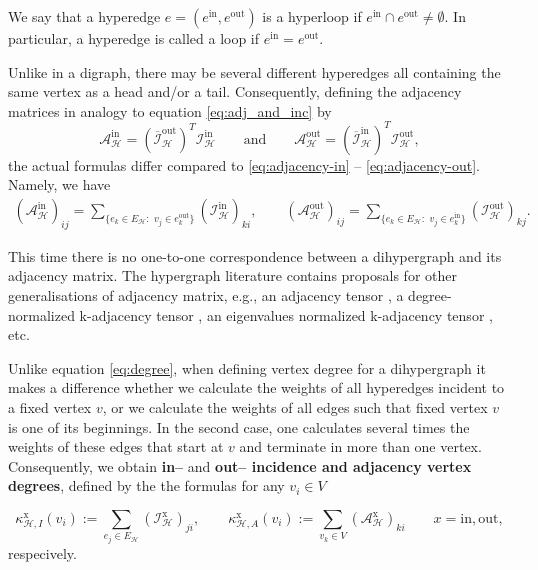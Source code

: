 \documentclass[a4paper,12pt]{article}
\theoremstyle{definition}
\theoremstyle{remark}
\newcommand{\mH}{\mathcal{H}}
\newcommand{\tin}{\mathrm{in}}
\newcommand{\out}{\mathrm{out}}
\newcommand{\inci}{\mathcal{I}^{\tin}}
\newcommand{\inco}{\mathcal{I}^{\out}}
\begin{document}
 We say that a hyperedge $e=(e^{\tin}, e^{\out})$ is a hyperloop if $e^{\tin}\cap e^{\out}\neq \emptyset$. In particular, a hyperedge is called a loop if $e^{\tin}=e^{\out}$. %
 
 Unlike in a digraph, there may be several different hyperedges all containing the same vertex as a head and/or a tail. Consequently, defining the adjacency matrices in analogy to equation \eqref{eq:adj_and_inc} by
 \begin{equation}\label{eq:adj_and_inc2}
\mathcal{A}_{\mH}^{\tin}=(\overline{\mathcal{I}}^{\textrm{out}}_{\mH})^T \inci_{\mH} \qquad \textrm{and}\qquad \mathcal{A}_{\mH}^{\out}=(\overline{\mathcal{I}}^{\textrm{in}}_{\mH})^T \inco_{\mH},
\end{equation}
the actual formulas differ compared to \eqref{eq:adjacency-in} -- \eqref{eq:adjacency-out}. Namely, we have
\begin{eqnarray}\label{eq:adjacency-in-out2}
(\mathcal{A}_{\mH}^{\tin})_{ij}=\sum_{\{e_k \in E_{\mH}:\,\, v_j\in e_k^{\out}\}}
(\inci_{\mH})_{ki},\qquad (\mathcal{A}_{\mH}^{\out})_{ij}=\sum_{\{e_k \in E_{\mH}:\,\, v_j\in e_k^{\tin}\}}(\inco_{\mH})_{kj}. 
\end{eqnarray}

This time there is no one-to-one correspondence between a dihypergraph and its adjacency matrix.
The hypergraph literature contains proposals for other generalisations of adjacency matrix, e.g., an adjacency tensor \protect\cite{Michoel2012}, a degree-normalized k-adjacency tensor \protect\cite{COOPER2012}, an eigenvalues normalized k-adjacency tensor \protect\cite{Hu2013}, etc.

Unlike equation \eqref{eq:degree}, when defining vertex degree for a dihypergraph it makes a difference whether we calculate the weights of all hyperedges incident to a fixed vertex $v$, or we calculate the weights of all edges such that fixed vertex $v$ is one of its beginnings. In the second case, one calculates several times the weights of these edges that start at $v$ and terminate in more than one vertex. Consequently, we obtain \textbf{in--} and \textbf{out-- incidence and adjacency vertex degrees}, defined by the the formulas for any $v_i\in V$

\begin{equation} 
    \kappa_{\mH, I}^{\mathrm{x}}(v_i):=\sum_{e_j\in E_{\mH}}(\mathcal{I}^{\textrm{x}}_{\mH})_{ji},\qquad \kappa_{\mH,A}^{\textrm{x}}(v_i):=\sum_{v_k\in V}(\mathcal{A}^{\textrm{x}}_{\mH})_{ki}\qquad x=\textrm{in},\textrm{out},
\end{equation}
respecively.
\end{document}
